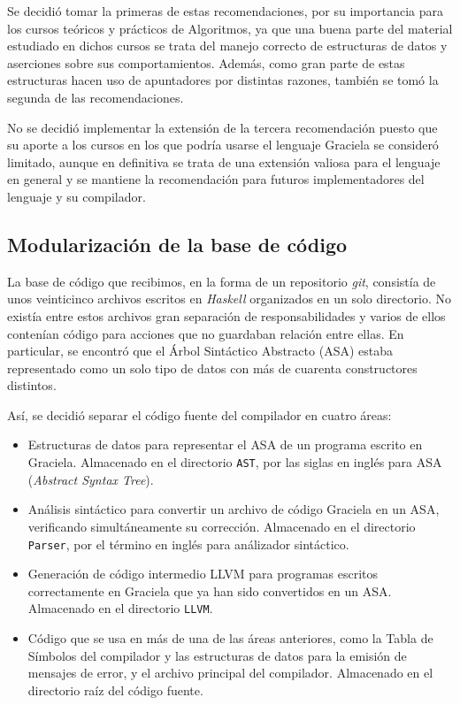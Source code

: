 Se decidió tomar la primeras de estas recomendaciones, por su importancia para
los cursos teóricos y prácticos de Algoritmos, ya que una buena parte del
material estudiado en dichos cursos se trata del manejo correcto de estructuras
de datos y aserciones sobre sus comportamientos. Además, como gran parte de
estas estructuras hacen uso de apuntadores por distintas razones, también se
tomó la segunda de las recomendaciones.

No se decidió implementar la extensión de la tercera recomendación puesto que su
aporte a los cursos en los que podría usarse el lenguaje Graciela se consideró
limitado, aunque en definitiva se trata de una extensión valiosa para el
lenguaje en general y se mantiene la recomendación para futuros
implementadores del lenguaje y su compilador.

\subsection{Modularización de la base de código}

La base de código que recibimos, en la forma de un repositorio \emph{git},
consistía de unos veinticinco archivos escritos en \emph{Haskell} organizados en
un solo directorio. No existía entre estos archivos gran separación de
responsabilidades y varios de ellos contenían código para acciones que no
guardaban relación entre ellas. En particular, se encontró que el Árbol
Sintáctico Abstracto (\textsc{ASA}) estaba representado como un solo tipo de
datos con más de cuarenta constructores distintos.

Así, se decidió separar el código fuente del compilador en cuatro áreas:
\begin{itemize}

  \item Estructuras de datos para representar el \textsc{ASA} de un programa
  escrito en Graciela. Almacenado en el directorio \texttt{AST}, por las siglas
  en inglés para \textsc{ASA} (\emph{Abstract Syntax Tree}).

  \item Análisis sintáctico para convertir un archivo de código Graciela en un
  ASA, verificando simultáneamente su corrección. Almacenado en el directorio
  \texttt{Parser}, por el término en inglés para análizador sintáctico.

  \item Generación de código intermedio LLVM para programas escritos
  correctamente en Graciela que ya han sido convertidos en un ASA. Almacenado en el
  directorio \texttt{LLVM}.

  \item Código que se usa en más de una de las áreas anteriores, como la Tabla
  de Símbolos del compilador y las estructuras de datos para la emisión de
  mensajes de error, y el archivo principal del compilador. Almacenado en el
  directorio raíz del código fuente.

\end{itemize}

